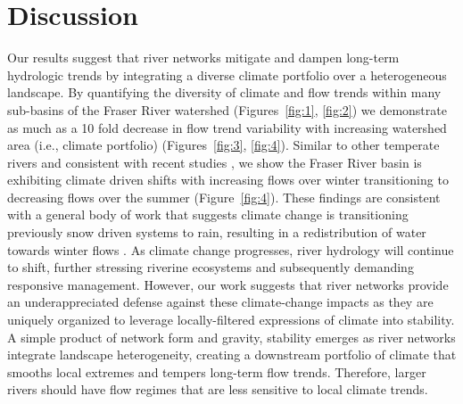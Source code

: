 \documentclass{AGUJournal}
\begin{document}
\section{Discussion}

Our results suggest that river networks mitigate and dampen long-term hydrologic trends by integrating a diverse climate portfolio over a heterogeneous landscape. By quantifying the diversity of climate and flow trends within many sub-basins of the Fraser River watershed (Figures~\ref{fig:1}, \ref{fig:2}) we demonstrate as much as a 10 fold decrease in flow trend variability with increasing watershed area (i.e., climate portfolio) (Figures~\ref{fig:3}, \ref{fig:4}). Similar to other temperate rivers \citep{Rauscher:2008} and consistent with recent studies \citep [e.g.,][]{Kang:2016, Kang:2014, Shrestha:2012}, we show the Fraser River basin is exhibiting climate driven shifts with increasing flows over winter transitioning to decreasing flows over the summer (Figure~\ref{fig:4}). These findings are consistent with a general body of work that suggests climate change is transitioning previously snow driven systems to rain, resulting in a redistribution of water towards winter flows \citep{Bindoff:2013}. As climate change progresses, river hydrology will continue to shift, further stressing riverine ecosystems and subsequently demanding responsive management. However, our work suggests that river networks provide an underappreciated defense against these climate-change impacts as they are uniquely organized to leverage locally-filtered expressions of climate into stability. A simple product of network form and gravity, stability emerges as river networks integrate landscape heterogeneity, creating a downstream portfolio of climate that smooths local extremes and tempers long-term flow trends. Therefore, larger rivers should have flow regimes that are less sensitive to local climate trends.
\end{document}

